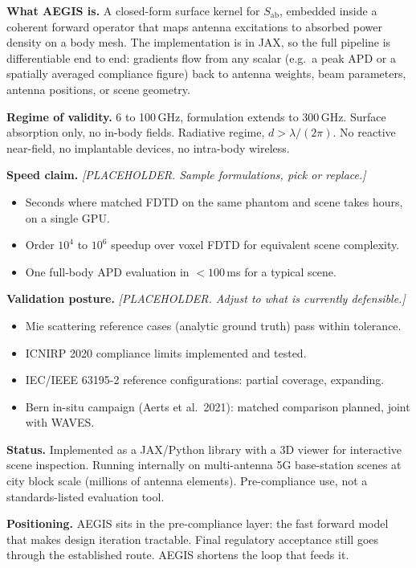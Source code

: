 \documentclass[11pt,a4paper]{article}
\begin{document}
\textbf{What AEGIS is.} A closed-form surface kernel for $S_\mathrm{ab}$, embedded inside a coherent forward operator that maps antenna excitations to absorbed power density on a body mesh. The implementation is in JAX, so the full pipeline is differentiable end to end: gradients flow from any scalar (e.g.\ a peak APD or a spatially averaged compliance figure) back to antenna weights, beam parameters, antenna positions, or scene geometry.

\textbf{Regime of validity.} 6 to 100\,GHz, formulation extends to 300\,GHz. Surface absorption only, no in-body fields. Radiative regime, $d > \lambda/(2\pi)$. No reactive near-field, no implantable devices, no intra-body wireless.

\textbf{Speed claim.}
\emph{[PLACEHOLDER. Sample formulations, pick or replace.]}
\begin{itemize}
  \item Seconds where matched FDTD on the same phantom and scene takes hours, on a single GPU.
  \item Order $10^{4}$ to $10^{6}$ speedup over voxel FDTD for equivalent scene complexity.
  \item One full-body APD evaluation in $<100$\,ms for a typical scene.
\end{itemize}

\textbf{Validation posture.}
\emph{[PLACEHOLDER. Adjust to what is currently defensible.]}
\begin{itemize}
  \item Mie scattering reference cases (analytic ground truth) pass within tolerance.
  \item ICNIRP 2020 compliance limits implemented and tested.
  \item IEC/IEEE 63195-2 reference configurations: partial coverage, expanding.
  \item Bern in-situ campaign (Aerts et al.\ 2021): matched comparison planned, joint with WAVES.
\end{itemize}

\textbf{Status.} Implemented as a JAX/Python library with a 3D viewer for interactive scene inspection. Running internally on multi-antenna 5G base-station scenes at city block scale (millions of antenna elements). Pre-compliance use, not a standards-listed evaluation tool.

\textbf{Positioning.} AEGIS sits in the pre-compliance layer: the fast forward model that makes design iteration tractable. Final regulatory acceptance still goes through the established route. AEGIS shortens the loop that feeds it.
\end{document}

